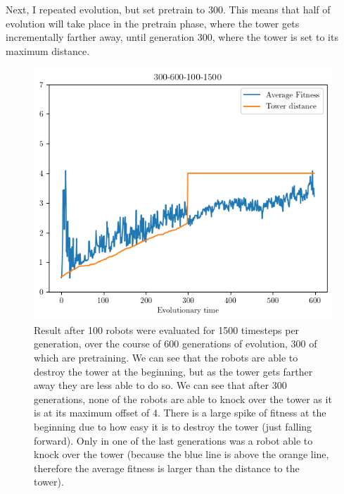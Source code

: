 \documentclass[12pt, a4paper]{article}
\begin{document}
Next, I repeated evolution, but set pretrain to 300. This means that half of evolution will take place in the pretrain phase, where the tower gets incrementally farther away, until generation 300, where the tower is set to its maximum distance.



\begin{figure}[h]
\centering
\includegraphics[width=1\textwidth]{300-600-100-1500/300-600-100-1500.png}
\caption{Result after 100 robots were evaluated for 1500 timesteps per generation, over the course of 600 generations of evolution, 300 of which are pretraining. We can see that the robots are able to destroy the tower at the beginning, but as the tower gets farther away they are less able to do so. We can see that after 300 generations, none of the robots are able to knock over the tower as it is at its maximum offset of 4. There is a large spike of fitness at the beginning due to how easy it is to destroy the tower (just falling forward). Only in one of the last generations was a robot able to knock over the tower (because the blue line is above the orange line, therefore the average fitness is larger than the distance to the tower).}
\end{figure}
\end{document}
